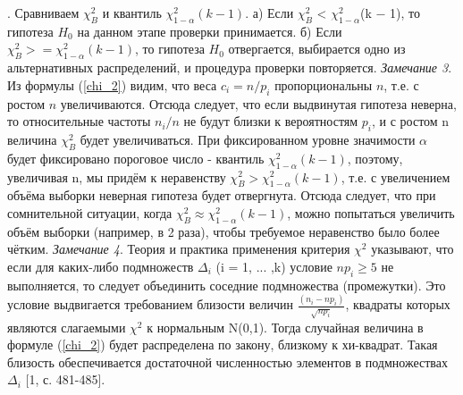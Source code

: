 . Сравниваем $\chi^{2}_{B}$ и квантиль $\chi^{2}_{1-\alpha}(k-1)$.
\newline
а) Если $\chi^{2}_{B}$ < $\chi^{2}_{1-\alpha}$(k $-$ 1), то гипотеза $H_{0}$ на данном этапе проверки принимается. 
\newline
б) Если $\chi^{2}_{B} >= \chi^{2}_{1-\alpha}(k -1)$, то гипотеза $H_{0}$ отвергается, выбирается одно из альтернативных распределений, и процедура проверки повторяется.
\newline
\textit{Замечание 3}. Из формулы (\ref{chi_2}) видим, что веса $c_i = n/p_{i}$ пропорциональны $n$, т.е. с ростом $n$ увеличиваются. Отсюда следует, что если выдвинутая гипотеза неверна, то относительные частоты $n_{i}/n$ не будут близки к вероятностям $p_{i}$, и с ростом n величина  $\chi^{2}_{B}$  будет увеличиваться. При фиксированном уровне значимости $\alpha$ будет фиксировано пороговое число - квантиль $\chi^{2}_{1-\alpha}(k-1)$, поэтому, увеличивая n, мы придём к неравенству $\chi^{2}_{B} > \chi^{2}_{1-\alpha}(k-1)$, т.е. с увеличением объёма выборки неверная гипотеза будет отвергнута.
\newline
Отсюда следует, что при сомнительной ситуации, когда $\chi^{2}_{B} \approx \chi^{2}_{1-\alpha}(k-1)$, можно попытаться увеличить объём выборки (например, в 2 раза), чтобы требуемое неравенство было более чётким.
\newline
\textit{Замечание 4}. Теория и практика применения критерия  $\chi^{2}$ указывают, что если для каких-либо подмножеств $\Delta_{i}$ (i = 1, ... ,k) условие $np_{i} \geq 5$ не выполняется, то следует объединить соседние подмножества (промежутки).
\newline
Это условие выдвигается требованием близости величин $\frac{(n_{i} -np_{i})}{\sqrt{np_{i}}}$, квадраты которых являются слагаемыми $\chi^{2}$  к нормальным N(0,1). Тогда случайная величина в формуле (\ref{chi_2}) будет распределена по закону, близкому к хи-квадрат. Такая близость обеспечивается достаточной численностью элементов в подмножествах $\Delta_{i}$ [1, с. 481-485].